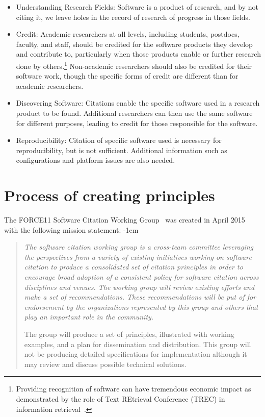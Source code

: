 \documentclass[12pt, oneside]{amsart}
\newenvironment{italicquotes}
{\begin{quote}\itshape}
{\end{quote}}
\begin{document}
\begin{itemize}
\item Understanding Research Fields: Software is a product of research, and by not
citing it, we leave holes in the record of research of progress in those fields.

\item Credit: Academic researchers at all levels, including students,
postdocs, faculty, and staff, should be credited for the software products they
develop and contribute to, particularly when those products enable or further
research done by others.\footnote{Providing recognition of software can have tremendous economic impact as demonstrated by the role of Text REtrieval Conference (TREC) in information retrieval~\cite{trec-economic-impact}.}
Non-academic researchers should also be credited for their software
work, though the specific forms of credit are different than for academic researchers.

\item Discovering Software: Citations enable the specific software used in a
research product to be found. Additional researchers can then use the same
software for different purposes, leading to credit for those responsible for the
software.

\item Reproducibility: Citation of specific software used is necessary for
reproducibility, but is not sufficient. Additional information such as
configurations and platform issues are also needed.

\end{itemize}

\section{Process of creating principles}
\label{sec:process}

The FORCE11 Software Citation Working Group~\cite{f11scwg} was created in April
2015 with the following mission statement:
\advance\leftmargini -1em
\begin{italicquotes}
The software citation working group is a cross-team committee leveraging the
perspectives from a variety of existing initiatives working on software citation
to produce a consolidated set of citation principles in order to encourage broad
adoption of a consistent policy for software citation across disciplines and
venues. The working group will review existing efforts and make a set of
recommendations. These recommendations will be put of for endorsement by the
organizations represented by this group and others that play an important role
in the community.

The group will produce a set of principles, illustrated with working examples,
and a plan for dissemination and distribution. This group will not be producing
detailed specifications for implementation although it may review and discuss
possible technical solutions.
\end{italicquotes}
\end{document}
